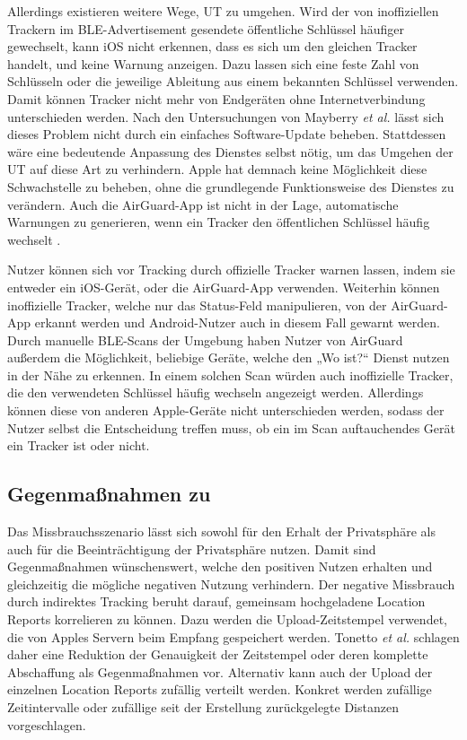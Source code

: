 Allerdings existieren weitere Wege, \ac{UT} zu umgehen.
Wird der von inoffiziellen Trackern im \ac{BLE}-Advertisement gesendete öffentliche Schlüssel häufiger gewechselt, kann iOS nicht erkennen, dass es sich um den gleichen Tracker handelt, und keine Warnung anzeigen.
Dazu lassen sich eine feste Zahl von Schlüsseln oder die jeweilige Ableitung aus einem bekannten Schlüssel verwenden.
Damit können Tracker nicht mehr von Endgeräten ohne Internetverbindung unterschieden werden.
Nach den Untersuchungen von Mayberry \textit{et al.} \cite{Mayberry_Tracking} lässt sich dieses Problem nicht durch ein einfaches Software-Update beheben.
Stattdessen wäre eine bedeutende Anpassung des Dienstes selbst nötig, um das Umgehen der \ac{UT} auf diese Art zu verhindern.
Apple hat demnach keine Möglichkeit diese Schwachstelle zu beheben, ohne die grundlegende Funktionsweise des Dienstes zu verändern.
Auch die AirGuard-App ist nicht in der Lage, automatische Warnungen zu generieren, wenn ein Tracker den öffentlichen Schlüssel häufig wechselt \cite{Heinrich_AirGuard}.

Nutzer können sich vor Tracking durch offizielle Tracker warnen lassen, indem sie entweder ein iOS-Gerät, oder die AirGuard-App verwenden.
Weiterhin können inoffizielle Tracker, welche nur das Status-Feld manipulieren, von der AirGuard-App erkannt werden und Android-Nutzer auch in diesem Fall gewarnt werden.
Durch manuelle \ac{BLE}-Scans der Umgebung haben Nutzer von AirGuard außerdem die Möglichkeit, beliebige Geräte, welche den „Wo ist?“ Dienst nutzen in der Nähe zu erkennen.
In einem solchen Scan würden auch inoffizielle Tracker, die den verwendeten Schlüssel häufig wechseln angezeigt werden.
Allerdings können diese von anderen Apple-Geräte nicht unterschieden werden, sodass der Nutzer selbst die Entscheidung treffen muss, ob ein im Scan auftauchendes Gerät ein Tracker ist oder nicht.

\subsection{Gegenmaßnahmen zu }

Das Missbrauchsszenario  lässt sich sowohl für den Erhalt der Privatsphäre als auch für die Beeinträchtigung der Privatsphäre nutzen.
Damit sind Gegenmaßnahmen wünschenswert, welche den positiven Nutzen erhalten und gleichzeitig die mögliche negativen Nutzung verhindern.
Der negative Missbrauch durch indirektes Tracking beruht darauf, gemeinsam hochgeladene Location Reports korrelieren zu können.
Dazu werden die Upload-Zeitstempel verwendet, die von Apples Servern beim Empfang gespeichert werden.
Tonetto \textit{et al.} \cite{Tonetto_FindMy} schlagen daher eine Reduktion der Genauigkeit der Zeitstempel oder deren komplette Abschaffung als Gegenmaßnahmen vor.
Alternativ kann auch der Upload der einzelnen Location Reports zufällig verteilt werden.
Konkret werden zufällige Zeitintervalle oder zufällige seit der Erstellung zurückgelegte Distanzen vorgeschlagen.

